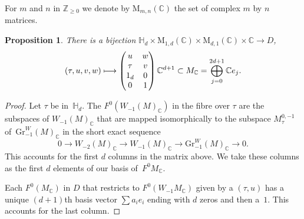 \documentclass[JEP,XML,SOM,Unicode,NoFloatCountersInSection]{cedram}
\def\mto{\mathchoice{\longmapsto}{\mapsto}{\mapsto}{\mapsto}}
\theoremstyle{plain}
\newtheorem{Proposition}[subsection]{Proposition}
\theoremstyle{definition}
\numberwithin{equation}{subsection}
\renewcommand{\C}{\mathbb C}
\newcommand{\Z}{\mathbb Z}
\renewcommand{\H}{\mathbb H}
\newcommand{\Gr}{\mathrm{Gr}}
\newcommand{\rmM}{\mathrm{M}}
\begin{document}
For $m$ and $n$ in $\Z_{\geq0}$ we denote by $\rmM_{m,n}(\C)$ the set
of complex $m$ by $n$ matrices.

\begin{Proposition}\label{prop:paramD}
There is a bijection
$\H_d\times \rmM_{1,d}(\C) \times \rmM_{d,1}(\C)\times \C \to D$,
\[
(\tau,u,v,w)\mto
\begin{pmatrix}
u & w\\ \tau & v \\ 1_d & 0\\ 0 & 1
\end{pmatrix}
\C^{d+1} \subset M_\C=\bigoplus_{j=0}^{2d+1}\C e_j.
\]
\end{Proposition}
\begin{proof}
Let $\tau$ be in~$\H_d$. The $F^0(W_{-1}(M)_\C)$ in the fibre over
$\tau$ are the subspaces of $W_{-1}(M)_\C$
that are mapped isomorphically to the subspace $M^{0,-1}_\tau$
of~$\Gr^W_{-1}(M)_\C$ in the short exact sequence
\[
0 \to W_{-2}(M)_\C \to W_{-1}(M)_\C \to \Gr^W_{-1}(M)_\C \to 0.
\]
This accounts for the first $d$ columns in the matrix above. We take these
columns as the first $d$ elements of our basis of~$F^0M_\C$.

Each $F^0(M_\C)$ in $D$ that restricts to $F^0(W_{-1}M_\C)$ given by
a $(\tau,u)$ has a unique $(d{+}1)$th basis vector
$\sum a_i e_i$ ending with $d$ zeros and then a~$1$. This accounts for
the last column.
\end{proof}
\end{document}
